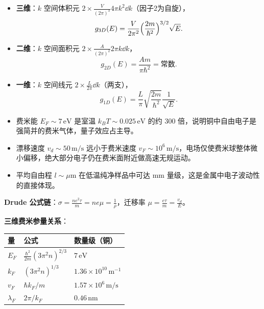 \begin{derivationbox}[标准解题过程]
\begin{itemize}
    \item \textbf{三维}：$k$ 空间体积元 $2\times\frac{V}{(2\pi)^3}4\pi k^2\dd k$（因子2为自旋），
    \begin{equation}
    g_{3D}(E)=\frac{V}{2\pi^2}\Bigl(\frac{2m}{\hbar^2}\Bigr)^{3/2}\sqrt{E}.
    \end{equation}
    \item \textbf{二维}：$k$ 空间面积元 $2\times\frac{A}{(2\pi)^2}2\pi k\dd k$，
    \begin{equation}
    g_{2D}(E)=\frac{Am}{\pi\hbar^2}=\text{常数}.
    \end{equation}
    \item \textbf{一维}：$k$ 空间线元 $2\times\frac{L}{2\pi}\dd k$（两支），
    \begin{equation}
    g_{1D}(E)=\frac{L}{\pi}\sqrt{\frac{2m}{\hbar^2}}\frac{1}{\sqrt{E}}.
    \end{equation}
\end{itemize}
\end{derivationbox}

\begin{insightbox}[物理图像]
\begin{itemize}
    \item 费米能 $E_F\sim7\,\text{eV}$ 是室温 $k_BT\sim0.025\,\text{eV}$ 的约 $300$ 倍，说明铜中自由电子是强简并的费米气体，量子效应占主导。
    \item 漂移速度 $v_d\sim50\,\text{m/s}$ 远小于费米速度 $v_F\sim10^6\,\text{m/s}$，电场仅使费米球整体微小偏移，绝大部分电子仍在费米面附近做高速无规运动。
    \item 平均自由程 $l\sim\mu\text{m}$ 在低温纯净样品中可达 mm 量级，这是金属中电子波动性的直接体现。
\end{itemize}
\end{insightbox}

\begin{formulabox}[考场速记]
\textbf{Drude 公式链}：$\sigma=\frac{ne^2\tau}{m}=ne\mu=\frac{1}{\rho}$，迁移率 $\mu=\frac{e\tau}{m}=\frac{v_d}{E}$。

\textbf{三维费米参量关系}：
\begin{center}
\begin{tabular}{lll}
\toprule
\textbf{量} & \textbf{公式} & \textbf{数量级（铜）} \\
\midrule
$E_F$ & $\frac{\hbar^2}{2m}(3\pi^2 n)^{2/3}$ & $7\,\text{eV}$ \\
$k_F$ & $(3\pi^2 n)^{1/3}$ & $1.36\times10^{10}\,\text{m}^{-1}$ \\
$v_F$ & $\hbar k_F/m$ & $1.57\times10^6\,\text{m/s}$ \\
$\lambda_F$ & $2\pi/k_F$ & $0.46\,\text{nm}$ \\
\bottomrule
\end{tabular}
\end{center}
\end{formulabox}
